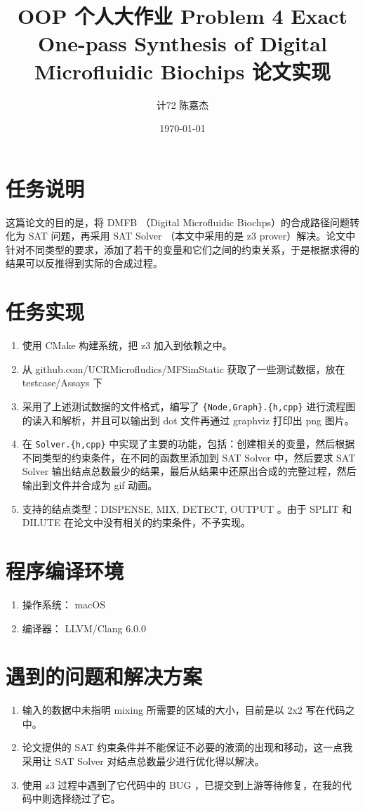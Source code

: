 \documentclass[11pt]{article}
\author{计72 陈嘉杰}
\date{\today}
\title{OOP 个人大作业 Problem 4 Exact One-pass Synthesis of Digital Microfluidic Biochips 论文实现}
\begin{document}
\maketitle
\tableofcontents

\section{任务说明}
\label{sec:org73ac9f5}
这篇论文的目的是，将 DMFB （Digital Microfluidic Biochps）的合成路径问题转化为 SAT 问题，再采用 SAT Solver （本文中采用的是 z3 prover）解决。论文中针对不同类型的要求，添加了若干的变量和它们之间的约束关系，于是根据求得的结果可以反推得到实际的合成过程。

\section{任务实现}
\label{sec:org4470066}
\begin{enumerate}
\item 使用 CMake 构建系统，把 z3 加入到依赖之中。
\item 从 github.com/UCRMicrofludics/MFSimStatic 获取了一些测试数据，放在 testcase/Assays 下
\item 采用了上述测试数据的文件格式，编写了 \texttt{\{Node,Graph\}.\{h,cpp\}} 进行流程图的读入和解析，并且可以输出到 dot 文件再通过 graphviz 打印出 png 图片。
\item 在 \texttt{Solver.\{h,cpp\}} 中实现了主要的功能，包括：创建相关的变量，然后根据不同类型的约束条件，在不同的函数里添加到 SAT Solver 中，然后要求 SAT Solver 输出结点总数最少的结果，最后从结果中还原出合成的完整过程，然后输出到文件并合成为 gif 动画。
\item 支持的结点类型：DISPENSE, MIX, DETECT, OUTPUT 。由于 SPLIT 和 DILUTE 在论文中没有相关的约束条件，不予实现。
\end{enumerate}

\section{程序编译环境}
\label{sec:orgd83f6d8}
\begin{enumerate}
\item 操作系统： macOS
\item 编译器： LLVM/Clang 6.0.0
\end{enumerate}

\section{遇到的问题和解决方案}
\label{sec:orgdfa9b95}
\begin{enumerate}
\item 输入的数据中未指明 mixing 所需要的区域的大小，目前是以 2x2 写在代码之中。
\item 论文提供的 SAT 约束条件并不能保证不必要的液滴的出现和移动，这一点我采用让 SAT Solver 对结点总数最少进行优化得以解决。
\item 使用 z3 过程中遇到了它代码中的 BUG ，已提交到上游等待修复，在我的代码中则选择绕过了它。
\end{enumerate}
\end{document}
